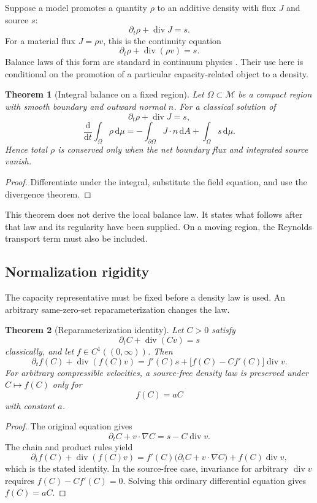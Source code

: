 \documentclass[11pt]{article}
\newtheorem{theorem}{Theorem}[section]
\theoremstyle{definition}
\theoremstyle{remark}
\newcommand{\cM}{\mathcal M}
\newcommand{\dd}{\mathrm d}
\newcommand{\Div}{\operatorname{div}}
\begin{document}
Suppose a model promotes a quantity \(\rho\) to an additive density with
flux \(J\) and source \(s\):
\[
 \partial_t\rho+\Div J=s.
\]
For a material flux \(J=\rho v\), this is the continuity equation
\[
 \partial_t\rho+\Div(\rho v)=s.
\]
Balance laws of this form are standard in continuum physics
\cite{Dafermos2016}.  Their use here is conditional on the promotion of a
particular capacity-related object to a density.

\begin{theorem}[Integral balance on a fixed region]
\label{thm:integral}
Let \(\Omega\subset\cM\) be a compact region with smooth boundary and
outward normal \(n\).  For a classical solution of
\[
 \partial_t\rho+\Div J=s,
\]
\[
 \frac{\dd}{\dd t}\int_\Omega\rho\,\dd\mu
 =
 -\int_{\partial\Omega}J\cdot n\,\dd A
 +\int_\Omega s\,\dd\mu.
\]
Hence total \(\rho\) is conserved only when the net boundary flux and
integrated source vanish.
\end{theorem}

\begin{proof}
Differentiate under the integral, substitute the field equation, and use
the divergence theorem.
\end{proof}

This theorem does not derive the local balance law.  It states what follows
after that law and its regularity have been supplied.  On a moving region,
the Reynolds transport term must also be included.

\subsection{Normalization rigidity}

The capacity representative must be fixed before a density law is used.
An arbitrary same-zero-set reparameterization changes the law.

\begin{theorem}[Reparameterization identity]
\label{thm:reparam}
Let \(C>0\) satisfy
\[
 \partial_tC+\Div(Cv)=s
\]
classically, and let \(f\in C^1((0,\infty))\).  Then
\[
 \partial_t f(C)+\Div(f(C)v)
 =
 f'(C)s+
 \bigl[f(C)-Cf'(C)\bigr]\Div v.
\]
For arbitrary compressible velocities, a source-free density law is
preserved under \(C\mapsto f(C)\) only for
\[
 f(C)=aC
\]
with constant \(a\).
\end{theorem}

\begin{proof}
The original equation gives
\[
 \partial_tC+v\cdot\nabla C=s-C\Div v.
\]
The chain and product rules yield
\[
 \partial_t f(C)+\Div(f(C)v)
 =
 f'(C)\bigl(\partial_tC+v\cdot\nabla C\bigr)+f(C)\Div v,
\]
which is the stated identity.  In the source-free case, invariance for
arbitrary \(\Div v\) requires \(f(C)-Cf'(C)=0\).  Solving this ordinary
differential equation gives \(f(C)=aC\).
\end{proof}
\end{document}
